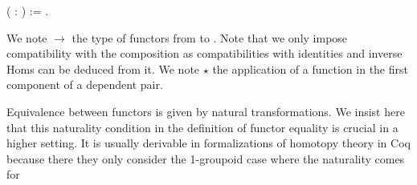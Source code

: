 \begin{coqdoccode}
\coqdocemptyline
\coqdocnoindent
{}  (  : ) := \coqdocnotation{\{} \coqdocnotation{:} \coqref{Groupoid.groupoid.::'[' x ']'}{\coqdocnotation{[}}\coqref{Groupoid.groupoid.::'[' x ']'}{\coqdocnotation{]}}  \coqref{Groupoid.groupoid.::'[' x ']'}{\coqdocnotation{[}}\coqref{Groupoid.groupoid.::'[' x ']'}{\coqdocnotation{]}} \coqdocnotation{\&}  \coqdocnotation{\}}.\coqdoceol
\coqdocemptyline
\end{coqdoccode}
\noindent We note  $\longrightarrow$  the type of functors from  to .
Note that we only impose compatibility with the composition as
compatibilities with identities and inverse Homs can be deduced from
it. We note  $\star$  the application of a function  in the first
component of a dependent pair. \begin{coqdoccode}
\end{coqdoccode}
Equivalence between functors is given by natural transformations.
  We insist here that this naturality condition in the definition of
  functor equality is crucial in a higher setting.  It is usually
  derivable in formalizations of homotopy theory in Coq because there they
  only consider the 1-groupoid case where the naturality comes for
